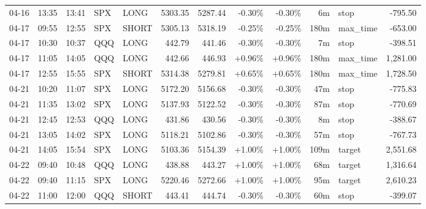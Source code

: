 \documentclass[11pt,a4paper,twoside]{article}
\begin{document}
\begin{center}
\begin{longtable}{>{\color{txtmain}}l l l l l r r r r r >{\color{txtmain}}l r}
04-16 & 13:35 & 13:41 & SPX & LONG & 5303.35 & 5287.44 & \textcolor{lossred}{-0.30\%} & \textcolor{lossred}{-0.30\%} & 6m & stop & \textcolor{lossred}{-795.50} \\
04-17 & 09:55 & 12:55 & SPX & SHORT & 5305.13 & 5318.19 & \textcolor{lossred}{-0.25\%} & \textcolor{lossred}{-0.25\%} & 180m & max\_time & \textcolor{lossred}{-653.00} \\
04-17 & 10:30 & 10:37 & QQQ & LONG & 442.79 & 441.46 & \textcolor{lossred}{-0.30\%} & \textcolor{lossred}{-0.30\%} & 7m & stop & \textcolor{lossred}{-398.51} \\
04-17 & 11:05 & 14:05 & QQQ & LONG & 442.66 & 446.93 & \textcolor{wingreen}{+0.96\%} & \textcolor{wingreen}{+0.96\%} & 180m & max\_time & \textcolor{wingreen}{1,281.00} \\
04-17 & 12:55 & 15:55 & SPX & SHORT & 5314.38 & 5279.81 & \textcolor{wingreen}{+0.65\%} & \textcolor{wingreen}{+0.65\%} & 180m & max\_time & \textcolor{wingreen}{1,728.50} \\
04-21 & 10:20 & 11:07 & SPX & LONG & 5172.20 & 5156.68 & \textcolor{lossred}{-0.30\%} & \textcolor{lossred}{-0.30\%} & 47m & stop & \textcolor{lossred}{-775.83} \\
04-21 & 11:35 & 13:02 & SPX & LONG & 5137.93 & 5122.52 & \textcolor{lossred}{-0.30\%} & \textcolor{lossred}{-0.30\%} & 87m & stop & \textcolor{lossred}{-770.69} \\
04-21 & 12:45 & 12:53 & QQQ & LONG & 431.86 & 430.56 & \textcolor{lossred}{-0.30\%} & \textcolor{lossred}{-0.30\%} & 8m & stop & \textcolor{lossred}{-388.67} \\
04-21 & 13:05 & 14:02 & SPX & LONG & 5118.21 & 5102.86 & \textcolor{lossred}{-0.30\%} & \textcolor{lossred}{-0.30\%} & 57m & stop & \textcolor{lossred}{-767.73} \\
04-21 & 14:05 & 15:54 & SPX & LONG & 5103.36 & 5154.39 & \textcolor{wingreen}{+1.00\%} & \textcolor{wingreen}{+1.00\%} & 109m & target & \textcolor{wingreen}{2,551.68} \\
04-22 & 09:40 & 10:48 & QQQ & LONG & 438.88 & 443.27 & \textcolor{wingreen}{+1.00\%} & \textcolor{wingreen}{+1.00\%} & 68m & target & \textcolor{wingreen}{1,316.64} \\
04-22 & 09:40 & 11:15 & SPX & LONG & 5220.46 & 5272.66 & \textcolor{wingreen}{+1.00\%} & \textcolor{wingreen}{+1.00\%} & 95m & target & \textcolor{wingreen}{2,610.23} \\
04-22 & 11:00 & 12:00 & QQQ & SHORT & 443.41 & 444.74 & \textcolor{lossred}{-0.30\%} & \textcolor{lossred}{-0.30\%} & 60m & stop & \textcolor{lossred}{-399.07} \\

\end{longtable}
\end{center}
\end{document}
